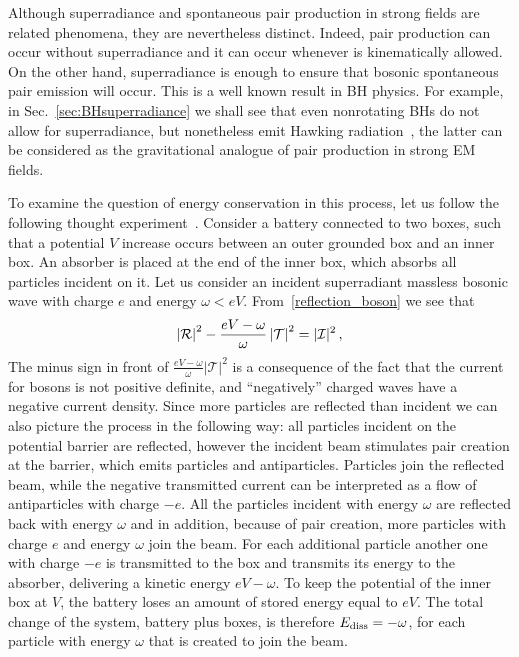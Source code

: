 \documentclass[11pt]{article}
\newcommand{\be}{\begin{equation}}
\newcommand{\ee}{\end{equation}}
\numberwithin{equation}{section} %
\begin{document}
Although superradiance and spontaneous pair production in strong fields are related phenomena, they are nevertheless 
distinct. Indeed, pair production can occur without superradiance and it can occur whenever is kinematically allowed. On 
the other hand, superradiance is enough to ensure that bosonic spontaneous pair emission will occur. This is a well 
known result in BH physics. For example, in Sec.~\ref{sec:BHsuperradiance} we shall see that even nonrotating BHs do not 
allow for superradiance, but nonetheless emit Hawking radiation~\cite{Hawking:1974sw}, the latter can be considered as 
the gravitational analogue of pair production in strong EM fields.



To examine the question of energy conservation in this process, let us follow the following thought experiment~\cite{Winter:1959AJP}. Consider a battery connected to two boxes, such that a potential $V$ increase occurs between an outer grounded box and an inner box. An absorber is placed at the end of the inner box, which absorbs all particles incident on it. Let us consider an incident superradiant massless bosonic wave with charge $e$ and energy $\omega<eV$. From~\eqref{reflection_boson} we see that
%
\be
\left|\mathcal{R}\right|^2-\frac{eV-\omega}{\omega}\left|\mathcal{T}\right|^2=|{\cal I}|^2\,,
\ee
% 
The minus sign in front of $\frac{eV-\omega}{\omega}\left|\mathcal{T}\right|^2$ is a consequence of the fact that the current for bosons is not positive definite, and ``negatively'' charged waves have a negative current density. Since more particles are reflected than incident we can also picture the process in the following way: all particles incident on the potential barrier are reflected, however the incident beam stimulates pair creation at the barrier, which emits particles and antiparticles. Particles join the reflected beam, while the negative transmitted current can be interpreted as a flow of antiparticles with charge $-e$.
%
All the particles incident with energy $\omega$ are reflected back with energy $\omega$ and in addition, because of pair creation, more particles with charge $e$ and energy $\omega$ join the beam. For each additional particle another one with charge $-e$ is transmitted to the box and transmits its energy to the absorber, delivering a kinetic energy $e V-\omega$. To keep the potential of the inner box at $V$, the battery loses an amount of stored energy equal to $eV$. The total change of the system, battery plus boxes, is therefore $E_{\rm diss}=-\omega$, for each particle with energy $\omega$ that is created to join the beam. 
\end{document}
